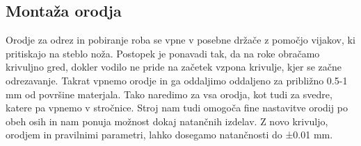 \subsection{Montaža orodja}
Orodje za odrez in pobiranje roba se vpne v posebne držače
z pomočjo vijakov, ki pritiskajo na steblo noža. Postopek je ponavadi tak,
da na roke obračamo krivuljno gred, dokler vodilo ne pride
na začetek vzpona krivulje, kjer se začne odrezavanje. Takrat vpnemo orodje
in ga oddaljimo oddaljeno za približno 0.5-1 mm od površine
materjala. Tako naredimo za vsa orodja, kot tudi za svedre,
katere pa vpnemo v stročnice.
Stroj nam tudi omogoča fine nastavitve orodij po obeh osih
in nam ponuja možnost dokaj natančnih izdelav. Z novo
krivuljo, orodjem in pravilnimi parametri, lahko dosegamo
natančnosti do ±0.01 mm.
